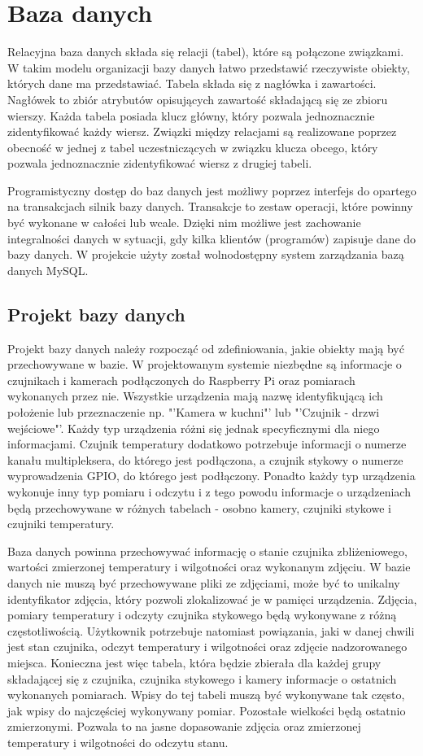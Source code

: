 \documentclass[a4paper,12pt,twoside]{article}
\begin{document}
\section{Baza danych}
Relacyjna baza danych składa się relacji (tabel), które są połączone związkami. W takim modelu organizacji bazy danych łatwo przedstawić rzeczywiste obiekty, których dane ma przedstawiać. Tabela składa się z nagłówka i zawartości. Nagłówek to zbiór atrybutów opisujących zawartość składającą się ze zbioru wierszy. Każda tabela posiada klucz główny, który pozwala jednoznacznie zidentyfikować każdy wiersz. Związki między relacjami są realizowane poprzez obecność w jednej z tabel uczestniczących w związku klucza obcego, który pozwala jednoznacznie zidentyfikować wiersz z drugiej tabeli.

Programistyczny dostęp do baz danych jest możliwy poprzez interfejs do opartego na transakcjach silnik bazy danych. Transakcje to zestaw operacji, które powinny być wykonane w całości lub wcale. Dzięki nim możliwe jest zachowanie integralności danych w sytuacji, gdy kilka klientów (programów) zapisuje dane do bazy danych. W projekcie użyty został wolnodostępny system zarządzania bazą danych MySQL.
\subsection{Projekt bazy danych}
Projekt bazy danych należy rozpocząć od zdefiniowania, jakie obiekty mają być przechowywane w bazie. W projektowanym systemie niezbędne są informacje o czujnikach i kamerach podłączonych do Raspberry Pi oraz pomiarach wykonanych przez nie. Wszystkie urządzenia mają nazwę identyfikującą ich położenie lub przeznaczenie np. "'Kamera w kuchni"' lub "'Czujnik - drzwi wejściowe"'. Każdy typ urządzenia różni się jednak specyficznymi dla niego informacjami. Czujnik temperatury dodatkowo potrzebuje informacji o numerze kanału multipleksera, do którego jest podłączona, a czujnik stykowy o numerze wyprowadzenia GPIO, do którego jest podłączony. Ponadto każdy typ urządzenia wykonuje inny typ pomiaru i odczytu i z tego powodu informacje o urządzeniach będą przechowywane w różnych tabelach - osobno kamery, czujniki stykowe i czujniki temperatury.

Baza danych powinna przechowywać informację o stanie czujnika zbliżeniowego, wartości zmierzonej temperatury i wilgotności oraz wykonanym zdjęciu. W bazie danych nie muszą być przechowywane pliki ze zdjęciami, może być to unikalny identyfikator zdjęcia, który pozwoli zlokalizować je w pamięci urządzenia. Zdjęcia, pomiary temperatury i odczyty czujnika stykowego będą wykonywane z różną częstotliwością. Użytkownik potrzebuje natomiast powiązania, jaki w danej chwili jest stan czujnika, odczyt temperatury i wilgotności oraz zdjęcie nadzorowanego miejsca. Konieczna jest więc tabela, która będzie zbierała dla każdej grupy składającej się z czujnika, czujnika stykowego i kamery informacje o ostatnich wykonanych pomiarach. Wpisy do tej tabeli muszą być wykonywane tak często, jak wpisy do najczęściej wykonywany pomiar. Pozostałe wielkości będą ostatnio zmierzonymi. Pozwala to na jasne dopasowanie zdjęcia oraz zmierzonej temperatury i wilgotności do odczytu stanu.
\end{document}
